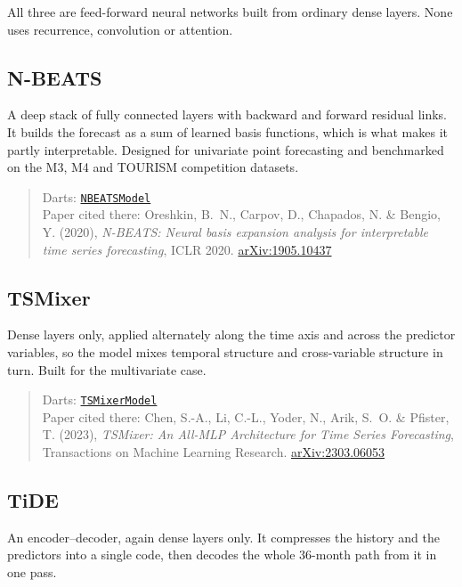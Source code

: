 All three are feed-forward neural networks built from ordinary dense layers. None uses recurrence,
convolution or attention.

\subsection*{N-BEATS}

A deep stack of fully connected layers with backward and forward residual links. It builds the
forecast as a sum of learned basis functions, which is what makes it partly interpretable. Designed
for univariate point forecasting and benchmarked on the M3, M4 and TOURISM competition datasets.

\begin{quote}
\small
Darts: \href{https://unit8co.github.io/darts/generated_api/darts.models.forecasting.nbeats.html}%
{\texttt{NBEATSModel}} \\
Paper cited there: Oreshkin, B.~N., Carpov, D., Chapados, N. \& Bengio, Y. (2020),
\textit{N-BEATS: Neural basis expansion analysis for interpretable time series forecasting},
ICLR 2020. \href{https://arxiv.org/abs/1905.10437}{arXiv:1905.10437}
\end{quote}

\subsection*{TSMixer}

Dense layers only, applied alternately along the time axis and across the predictor variables, so
the model mixes temporal structure and cross-variable structure in turn. Built for the multivariate
case.

\begin{quote}
\small
Darts: \href{https://unit8co.github.io/darts/generated_api/darts.models.forecasting.tsmixer_model.html}%
{\texttt{TSMixerModel}} \\
Paper cited there: Chen, S.-A., Li, C.-L., Yoder, N., Arik, S.~O. \& Pfister, T. (2023),
\textit{TSMixer: An All-MLP Architecture for Time Series Forecasting}, Transactions on Machine
Learning Research. \href{https://arxiv.org/abs/2303.06053}{arXiv:2303.06053}
\end{quote}

\subsection*{TiDE}

An encoder--decoder, again dense layers only. It compresses the history and the predictors into a
single code, then decodes the whole 36-month path from it in one pass.

